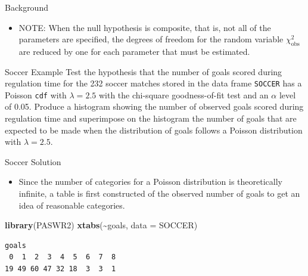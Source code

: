 \documentclass[
  ignorenonframetext,
]{beamer}
\newenvironment{Shaded}{\begin{snugshade}}{\end{snugshade}}
\newcommand{\AttributeTok}[1]{\textcolor[rgb]{0.13,0.29,0.53}{#1}}
\newcommand{\FunctionTok}[1]{\textcolor[rgb]{0.13,0.29,0.53}{\textbf{#1}}}
\newcommand{\NormalTok}[1]{#1}
\newcommand{\SpecialCharTok}[1]{\textcolor[rgb]{0.81,0.36,0.00}{\textbf{#1}}}
\providecommand{\tightlist}{%
  \setlength{\itemsep}{0pt}\setlength{\parskip}{0pt}}
\begin{document}
\begin{frame}{Background}
\label{background-5}
\begin{itemize}
\tightlist
\item
  NOTE: When the null hypothesis is composite, that is, not all of the
  parameters are specified, the degrees of freedom for the random
  variable \(\chi_\text{obs}^2\) are reduced by one for each parameter
  that must be estimated.
\end{itemize}
\end{frame}

\begin{frame}[fragile]{Soccer Example}
\label{soccer-example}
Test the hypothesis that the number of goals scored during regulation
time for the 232 soccer matches stored in the data frame \texttt{SOCCER}
has a Poisson \texttt{cdf} with \(\lambda=2.5\) with the chi-square
goodness-of-fit test and an \(\alpha\) level of 0.05. Produce a
histogram showing the number of observed goals scored during regulation
time and superimpose on the histogram the number of goals that are
expected to be made when the distribution of goals follows a Poisson
distribution with \(\lambda=2.5\).
\end{frame}

\begin{frame}[fragile]{Soccer Solution}
\label{soccer-solution}
\begin{itemize}
\tightlist
\item
  Since the number of categories for a Poisson distribution is
  theoretically infinite, a table is first constructed of the observed
  number of goals to get an idea of reasonable categories.
\end{itemize}

\begin{Shaded}
\begin{Highlighting}[]
\FunctionTok{library}\NormalTok{(PASWR2)}
\FunctionTok{xtabs}\NormalTok{(}\SpecialCharTok{\textasciitilde{}}\NormalTok{goals, }\AttributeTok{data =}\NormalTok{ SOCCER)}
\end{Highlighting}
\end{Shaded}

\begin{verbatim}
goals
 0  1  2  3  4  5  6  7  8 
19 49 60 47 32 18  3  3  1 
\end{verbatim}
\end{frame}
\end{document}
